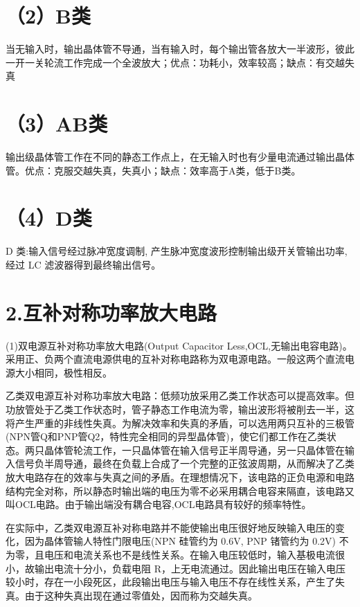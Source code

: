 \documentclass[
  10
]{article}
\begin{document}
\section{（2）B类}\label{bux7c7b}

当无输入时，输出晶体管不导通，当有输入时，每个输出管各放大一半波形，彼此一开一关轮流工作完成一个全波放大；优点：功耗小，效率较高；缺点：有交越失真

\section{（3）AB类}\label{abux7c7b}

输出级晶体管工作在不同的静态工作点上，在无输入时也有少量电流通过输出晶体管。优点：克服交越失真，失真小；缺点：效率高于A类，低于B类。

\section{（4）D类}\label{dux7c7b}

D 类:输入信号经过脉冲宽度调制, 产生脉冲宽度波形控制输出级开关管输出功率,
经过 LC 滤波器得到最终输出信号。

\section{2.互补对称功率放大电路}\label{ux4e92ux8865ux5bf9ux79f0ux529fux7387ux653eux5927ux7535ux8def}

(1)双电源互补对称功率放大电路(Output Capacitor
Less,OCL,无输出电容电路)。采用正、负两个直流电源供电的互补对称电路称为双电源电路。一般这两个直流电源大小相同，极性相反。

乙类双电源互补对称功率放大电路：低频功放采用乙类工作状态可以提高效率。但功放管处于乙类工作状态时，管子静态工作电流为零，输出波形将被削去一半，这将产生严重的非线性失真。为解决效率和失真的矛盾，可以选用两只互补的三极管(NPN管Q和PNP管Q2，特性完全相同的异型晶体管)，使它们都工作在乙类状态。两只晶体管轮流工作，一只晶体管在输入信号正半周导通，另一只晶体管在输入信号负半周导通，最终在负载上合成了一个完整的正弦波周期，从而解决了乙类放大电路存在的效率与失真之间的矛盾。在理想情况下，该电路的正负电源和电路结构完全对称，所以静态时输出端的电压为零不必采用耦合电容来隔直，该电路又叫OCL电路。由于输出端没有耦合电容,OCL电路具有较好的频率特性。

在实际中，乙类双电源互补对称电路并不能使输出电压很好地反映输入电压的变化，因为晶体管输人特性门限电压(NPN
硅管约为 0.6V, PNP 锗管约为 0.2V)
不为零，且电压和电流关系也不是线性关系。在输入电压较低时，输入基极电流很小，故输出电流十分小，负载电阻
R，上无电流通过。因此输出电压在输入电压较小时，存在一小段死区，此段输出电压与输入电压不存在线性关系，产生了失真。由于这种失真出现在通过零值处，因而称为交越失真。
\end{document}
